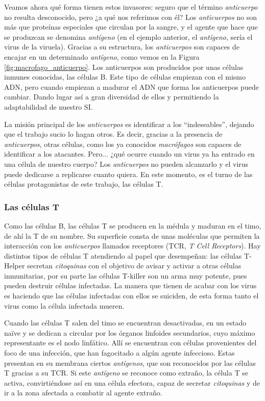 Veamos ahora qué forma tienen estos invasores: seguro que el término \textit{anticuerpo} no resulta desconocido, pero ¿a qué nos referimos con él? Los \textit{anticuerpos} no son más que proteínas especiales que circulan por la sangre, y el agente que hace que se produzcan se denomina \textit{antígeno} (en el ejemplo anterior, el \textit{antígeno}, sería el virus de la viruela). Gracias a su estructura, los \textit{anticuerpos} son capaces de encajar en un determinado \textit{antígeno}, como vemos en la Figura \ref{fig:macrofago_anticuerpo}. Los anticuerpos son producidos por unas células inmunes conocidas, las células B. Este tipo de células empiezan con el mismo ADN, pero cuando empiezan a madurar el ADN que forma los anticuerpos puede cambiar. Dando lugar así a gran diversidad de ellos y permitiendo la adaptabilidad de nuestro SI.

La misión principal de los \textit{anticuerpos} es identificar a los ``indeseables'', dejando que el trabajo sucio lo hagan otros. Es decir, gracias a la presencia de \textit{anticuerpos}, otras células, como los ya conocidos \textit{macrófagos} son capaces de identificar a los atacantes. Pero... ¿qué ocurre cuando un virus ya ha entrado en una célula de nuestro cuerpo? Los \textit{anticuerpos} no pueden alcanzarlo y el virus puede dedicarse a replicarse cuanto quiera. En este momento, es el turno de las células protagonistas de este trabajo, las células T. 

\subsubsection{Las células T}
Como las células B, las células T se producen en la médula y maduran en el timo, de ahí la T de su nombre. Su superficie consta de unas moléculas que permiten la interacción con los \textit{anticuerpos} llamados receptores (TCR, \textit{T Cell Receptors}). Hay distintos tipos de células T atendiendo al papel que desempeñan: las células T-Helper secretan \textit{citoquinas} con el objetivo de avisar y activar a otras células inmunitarias, por su parte las células T-killer son un arma muy potente, pues pueden destruir células infectadas. La manera que tienen de acabar con los virus es haciendo que las células infectadas con ellos se suiciden, de esta forma tanto el virus como la célula infectada mueren.

Cuando las células T salen del timo se encuentran desactivadas, en un estado naïve y se dedican a circular por los órganos linfoides secundarios, cuyo máximo representante es el nodo linfático. Allí se encuentran con células provenientes del foco de una infección, que han fagocitado a algún agente infeccioso. Estas presentan en su membrana ciertos \textit{antígenos}, que son reconocidos por las células T gracias a su TCR. Si este \textit{antígeno} se reconoce como extraño, la célula T se activa, convirtiéndose así en una célula efectora, capaz de secretar \textit{citoquinas} y de ir a la zona afectada a combatir al agente extraño.

